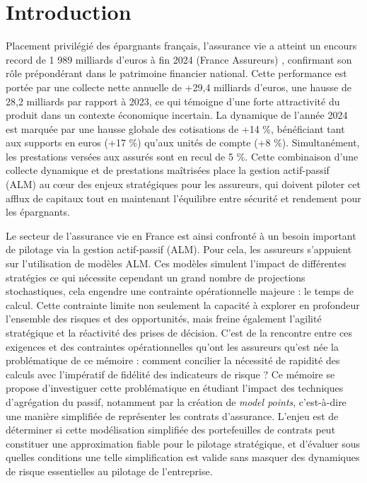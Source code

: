 \chapter*{Introduction}


Placement privilégié des épargnants français, l'assurance vie a atteint un encours record de 1 989 milliards d'euros à fin 2024 (France Assureurs) \cite{france_assureurs}, confirmant son rôle prépondérant dans le patrimoine financier national. Cette performance est portée par une collecte nette annuelle de +29,4 milliards d'euros, une hausse de 28,2 milliards par rapport à 2023, ce qui témoigne d'une forte attractivité du produit dans un contexte économique incertain. La dynamique de l'année 2024 est marquée par une hausse globale des cotisations de +14 \%, bénéficiant tant aux supports en euros (+17 \%) qu'aux unités de compte (+8 \%). Simultanément, les prestations versées aux assurés sont en recul de 5 \%. Cette combinaison d'une collecte dynamique et de prestations maîtrisées place la gestion actif-passif (ALM) au cœur des enjeux stratégiques pour les assureurs, qui doivent piloter cet afflux de capitaux tout en maintenant l'équilibre entre sécurité et rendement pour les épargnants.

Le secteur de l'assurance vie en France est ainsi confronté à un besoin important de pilotage via la gestion actif-passif (ALM). Pour cela, les assureurs s'appuient sur l'utilisation de modèles ALM. Ces modèles simulent l'impact de différentes stratégies ce qui nécessite cependant un grand nombre de projections stochastiques, cela engendre une contrainte opérationnelle majeure : le temps de calcul. Cette contrainte limite non seulement la capacité à explorer en profondeur l'ensemble des risques et des opportunités, mais freine également l'agilité stratégique et la réactivité des prises de décision. C'est de la rencontre entre ces exigences et des contraintes opérationnelles qu'ont les assureurs qu'est née la problématique de ce mémoire : comment concilier la nécessité de rapidité des calculs avec l'impératif de fidélité des indicateurs de risque ? Ce mémoire se propose d'investiguer cette problématique en étudiant l'impact des techniques d'agrégation du passif, notamment par la création de \textit{model points}, c'est-à-dire une manière simplifiée de représenter les contrats d'assurance. L'enjeu est de déterminer si cette modélisation simplifiée des portefeuilles de contrats peut constituer une approximation fiable pour le pilotage stratégique, et d'évaluer sous quelles conditions une telle simplification est valide sans masquer des dynamiques de risque essentielles au pilotage de l'entreprise.

